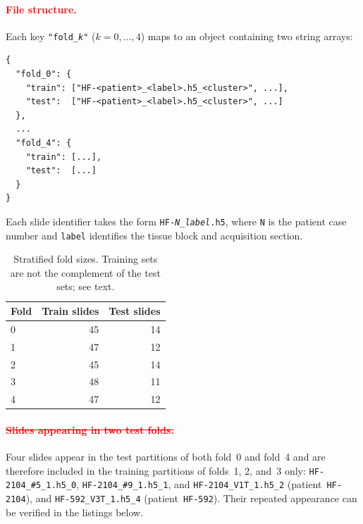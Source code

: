 \paragraph{\textcolor{red}{File structure.}} Each key \texttt{"fold\_\textit{k}"} ($k = 0, \ldots, 4$) maps to an object containing two string arrays:

\begin{verbatim}
{
  "fold_0": {
    "train": ["HF-<patient>_<label>.h5_<cluster>", ...],
    "test":  ["HF-<patient>_<label>.h5_<cluster>", ...]
  },
  ...
  "fold_4": {
    "train": [...],
    "test":  [...]
  }
}
\end{verbatim}

Each slide identifier takes the form \texttt{HF-\textit{N}\_\textit{label}.h5}, where \texttt{N} is the patient case number and \texttt{label} identifies the tissue block and acquisition section.

\begin{table}[H]
\centering
\small
\begin{tabular}{lrr}
\toprule
Fold & Train slides & Test slides \\
\midrule
0 & 45 & 14 \\
1 & 47 & 12 \\
2 & 45 & 14 \\
3 & 48 & 11 \\
4 & 47 & 12 \\
\bottomrule
\end{tabular}
\caption{Stratified fold sizes. Training sets are not the complement of the test sets; see text.}
\label{tab:cv_folds_summary}
\end{table}

\paragraph{\textcolor{red}{\sout{Slides appearing in two test folds.}}}
Four slides appear in the test partitions of both fold~0 and fold~4 and are therefore included in the training partitions of folds~1, 2, and~3 only: \texttt{HF-2104\_\#5\_1.h5\_0}, \texttt{HF-2104\_\#9\_1.h5\_1}, and \texttt{HF-2104\_V1T\_1.h5\_2} (patient~\texttt{HF-2104}), and \texttt{HF-592\_V3T\_1.h5\_4} (patient~\texttt{HF-592}). Their repeated appearance can be verified in the listings below.

